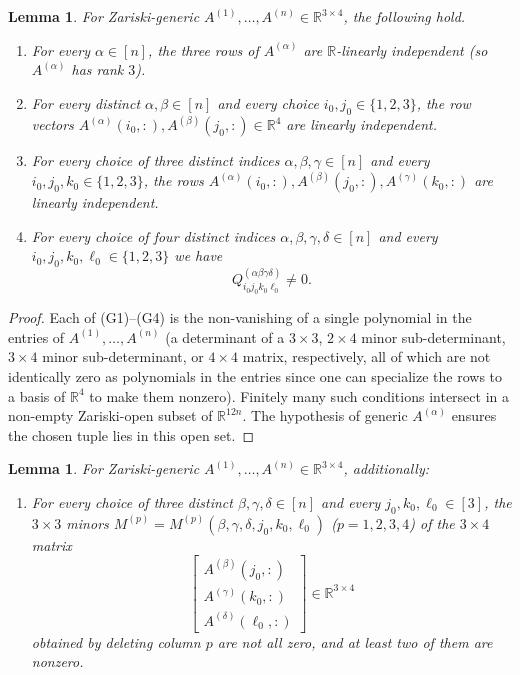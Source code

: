 \documentclass[12pt]{article}
\newtheorem{lemma}[theorem]{Lemma}
\theoremstyle{definition}
\begin{document}
\begin{lemma}\label{lem:generic-AB}
For Zariski-generic $A^{(1)},\ldots,A^{(n)}\in\mathbb{R}^{3\times 4}$, the following hold.
\begin{enumerate}
\item[(G1)] For every $\alpha\in[n]$, the three rows of $A^{(\alpha)}$ are
$\mathbb{R}$-linearly independent (so $A^{(\alpha)}$ has rank $3$).
\item[(G2)] For every distinct $\alpha,\beta\in[n]$ and every choice
$i_0,j_0\in\{1,2,3\}$, the row vectors $A^{(\alpha)}(i_0,:),A^{(\beta)}(j_0,:)\in\mathbb{R}^4$
are linearly independent.
\item[(G3)] For every choice of three distinct indices $\alpha,\beta,\gamma\in[n]$ and
every $i_0,j_0,k_0\in\{1,2,3\}$, the rows
$A^{(\alpha)}(i_0,:),A^{(\beta)}(j_0,:),A^{(\gamma)}(k_0,:)$ are linearly independent.
\item[(G4)] For every choice of four distinct indices $\alpha,\beta,\gamma,\delta\in[n]$
and every $i_0,j_0,k_0,\ell_0\in\{1,2,3\}$ we have
\[
Q^{(\alpha\beta\gamma\delta)}_{i_0 j_0 k_0 \ell_0}\neq 0.
\]
\end{enumerate}
\end{lemma}

\begin{proof}
Each of (G1)--(G4) is the non-vanishing of a single polynomial in the entries of
$A^{(1)},\ldots,A^{(n)}$ (a determinant of a $3\times 3$, $2\times 4$ minor sub-determinant,
$3\times 4$ minor sub-determinant, or $4\times 4$ matrix, respectively, all of which are
not identically zero as polynomials in the entries since one can specialize the rows to a
basis of $\mathbb{R}^4$ to make them nonzero). Finitely many such conditions intersect in a
non-empty Zariski-open subset of $\mathbb{R}^{12n}$. The hypothesis of generic
$A^{(\alpha)}$ ensures the chosen tuple lies in this open set.
\end{proof}

\begin{lemma}\label{lem:generic-cofactor}
For Zariski-generic $A^{(1)},\ldots,A^{(n)}\in\mathbb{R}^{3\times 4}$, additionally:
\begin{enumerate}
\item[(G5)] For every choice of three distinct $\beta,\gamma,\delta\in[n]$ and every
$j_0,k_0,\ell_0\in[3]$, the $3\times 3$ minors
$M^{(p)}=M^{(p)}(\beta,\gamma,\delta,j_0,k_0,\ell_0)$
($p=1,2,3,4$) of the $3\times 4$ matrix
\[
\begin{bmatrix}A^{(\beta)}(j_0,:)\\ A^{(\gamma)}(k_0,:)\\ A^{(\delta)}(\ell_0,:)\end{bmatrix}\in\mathbb{R}^{3\times 4}
\]
obtained by deleting column $p$ are not all zero, and at least two of them are nonzero.
\end{enumerate}
\end{lemma}
\end{document}
